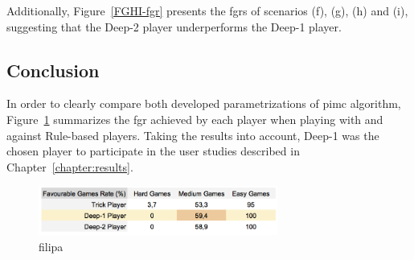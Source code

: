 Additionally, Figure~\ref{FGHI-fgr} presents the \acp{fgr} of scenarios (f), (g), (h) and (i), suggesting that the Deep-2 player underperforms the Deep-1 player.

\subsection{Conclusion}

In order to clearly compare both developed parametrizations of \ac{pimc} algorithm, Figure~\ref{fig:DFH-fgr} summarizes the \ac{fgr} achieved by each player when playing with and against Rule-based players.
Taking the results into account, Deep-1 was the chosen player to participate in the user studies described in Chapter~\ref{chapter:results}.

\begin{figure}[h!]
  \centering
    \includegraphics[width=0.7\textwidth]{./img/4/DFH-fgr}
  \caption{filipa}
\label{fig:DFH-fgr}
\end{figure}
